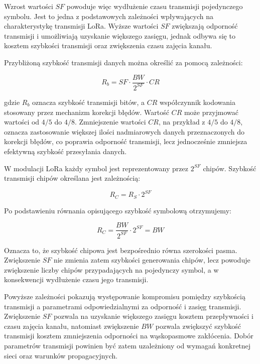 \documentclass[12pt,a4paper,twoside]{report}
\theoremstyle{definition} %
\begin{document}
Wzrost wartości \(SF\) powoduje więc wydłużenie czasu transmisji pojedynczego symbolu. Jest to jedna z podstawowych zależności wpływających na charakterystykę transmisji LoRa. Wyższe wartości \(SF\) zwiększają odporność transmisji i umożliwiają uzyskanie większego zasięgu, jednak odbywa się to kosztem szybkości transmisji oraz zwiększenia czasu zajęcia kanału.

Przybliżoną szybkość transmisji danych można określić za pomocą zależności:

	\begin{equation}\label{R_b}
        R_b = SF \cdot \frac{BW}{2^{SF}} \cdot CR
    \end{equation}

gdzie \(R_b\) oznacza szybkość transmisji bitów, a \(CR\) współczynnik kodowania stosowany przez mechanizm korekcji błędów. Wartość \(CR\) może przyjmować wartości od \(4/5\) do \(4/8\). Zmniejszenie wartości \(CR\), na przykład z \(4/5\) do \(4/8\), oznacza zastosowanie większej ilości nadmiarowych danych przeznaczonych do korekcji błędów, co poprawia odporność transmisji, lecz jednocześnie zmniejsza efektywną szybkość przesyłania danych.

W modulacji LoRa każdy symbol jest reprezentowany przez \(2^{SF}\) chipów. Szybkość transmisji chipów określana jest zależnością:

	\begin{equation}\label{R_C}
        R_C = R_S \cdot 2^{SF}
    \end{equation}

Po podstawieniu równania opisującego szybkość symbolową otrzymujemy:

	\begin{equation}\label{wzór}
        R_C = \frac{BW}{2^{SF}}\cdot 2^{SF}=BW
    \end{equation}

Oznacza to, że szybkość chipowa jest bezpośrednio równa szerokości pasma. Zwiększenie \(SF\) nie zmienia zatem szybkości generowania chipów, lecz powoduje zwiększenie liczby chipów przypadających na pojedynczy symbol, a w konsekwencji wydłużenie czasu jego transmisji.

Powyższe zależności pokazują występowanie kompromisu pomiędzy szybkością transmisji a parametrami odpowiedzialnymi za odporność i zasięg transmisji. Zwiększenie \(SF\) pozwala na uzyskanie większego zasięgu kosztem przepływności i czasu zajęcia kanału, natomiast zwiększenie \(BW\) pozwala zwiększyć szybkość transmisji kosztem zmniejszenia odporności na wąskopasmowe zakłócenia. Dobór parametrów transmisji powinien być zatem uzależniony od wymagań konkretnej sieci oraz warunków propagacyjnych.
\end{document}
